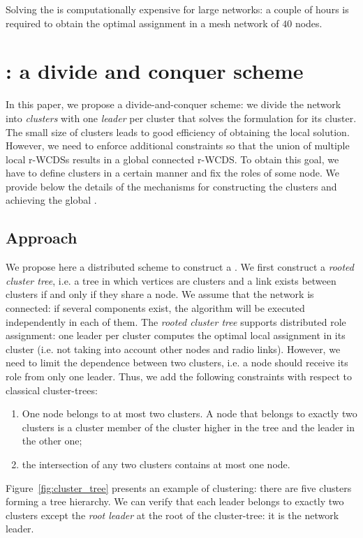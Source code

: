 \documentclass[twoside]{article}
\begin{document}
Solving the \milp is computationally expensive for large networks: a
couple of hours is required to obtain the optimal assignment in a mesh
network of $40$ nodes.




\section{\potatoes: a divide and conquer scheme}
\label{section:potatoes_description}


In this paper, we propose a divide-and-conquer scheme: we divide the
network into \emph{clusters} with one \emph{leader} per cluster that
solves the \milp formulation for its cluster. The small size of
clusters leads to good efficiency of obtaining the local \milp
solution. However, we need to enforce additional constraints so that
the union of multiple local r-WCDSs results in a global connected
r-WCDS.  To obtain this goal, we have to define clusters in a certain
manner and fix the roles of some node. We provide below the details of
the mechanisms for constructing the clusters and achieving the global
\rwcds.


\subsection{Approach}

We propose here a distributed scheme to construct a \rwcds. We first
construct a \emph{rooted cluster tree}, i.e. a tree in which
vertices are clusters and a link exists between clusters if and only if they
share a node. We assume that the network is connected: if several
components exist, the algorithm will be executed independently in each of
them. The \emph{rooted cluster tree} supports distributed role
assignment: one leader per cluster computes the optimal local
assignment in its cluster (i.e. not taking into account other nodes
and radio links). However, we need to limit the dependence between two
clusters, i.e. a node should receive its role from only one
leader. Thus, we add the following constraints with respect to
classical cluster-trees:
\begin{enumerate}
\item One node belongs to at most two clusters. A node that
  belongs to exactly two clusters is a cluster member of the cluster
  higher in the tree and the leader in the other one;
\item the intersection of any two clusters contains at most one node.
\end{enumerate}
Figure~\ref{fig:cluster_tree} presents an example of clustering: there
are five clusters forming a tree hierarchy. We can verify that each
leader belongs to exactly two clusters except the \emph{root leader}
at the root of the cluster-tree: it is the network leader.
\end{document}
